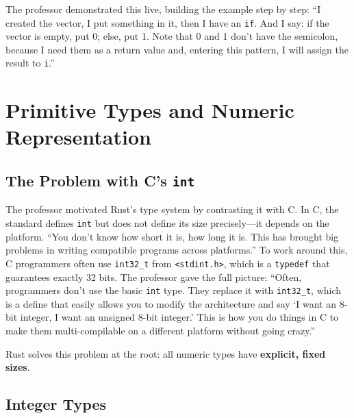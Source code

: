 The professor demonstrated this live, building the example step by step: ``I created the vector, I put something in it, then I have an \texttt{if}. And I say: if the vector is empty, put 0; else, put 1. Note that 0 and 1 don't have the semicolon, because I need them as a return value and, entering this pattern, I will assign the result to \texttt{i}.''

\section{Primitive Types and Numeric Representation}


\subsection{The Problem with C's \texttt{int}}

The professor motivated Rust's type system by contrasting it with C. In C, the standard defines \texttt{int} but does not define its size precisely---it depends on the platform. ``You don't know how short it is, how long it is. This has brought big problems in writing compatible programs across platforms.'' To work around this, C programmers often use \texttt{int32\_t} from \texttt{<stdint.h>}, which is a \texttt{typedef} that guarantees exactly 32 bits. The professor gave the full picture: ``Often, programmers don't use the basic \texttt{int} type. They replace it with \texttt{int32\_t}, which is a define that easily allows you to modify the architecture and say `I want an 8-bit integer, I want an unsigned 8-bit integer.' This is how you do things in C to make them multi-compilable on a different platform without going crazy.''

Rust solves this problem at the root: all numeric types have \textbf{explicit, fixed sizes}.

\subsection{Integer Types}

